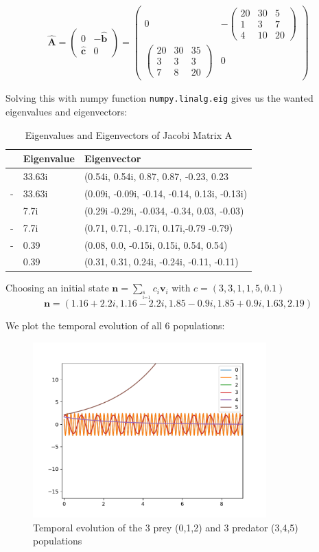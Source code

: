 \documentclass{article}
\begin{document}
\begin{align}
    \mathbf{\hat A} = 
    \left(
	\begin{matrix}
	    0 & - \mathbf{\hat b} \\
	    \mathbf{\hat c} & 0
	\end{matrix}
    \right) = %
    \left( \begin{matrix}
    0 &
    - \left(
	\begin{matrix}
	    20 & 30 & 5 \\ 
	    1 & 3 & 7 \\
	    4 & 10 & 20 
	\end{matrix}
    \right) \\
    \left(
	\begin{matrix}
	    20 & 30 & 35 \\ 
	    3 & 3 & 3 \\
	    7 & 8 & 20 
	\end{matrix}
    \right) & 0
    \end{matrix} \right)
\end{align}

Solving this with numpy function \texttt{numpy.linalg.eig} gives us the wanted
eigenvalues and eigenvectors:

\begin{table}[H]
    \centering
    \begin{tabular}{rll}
	\toprule 
& Eigenvalue & Eigenvector \\ \midrule
&33.63i & (0.54i, 0.54i, 0.87, 0.87, -0.23, 0.23 \\ 
-&33.63i & (0.09i, -0.09i, -0.14, -0.14, 0.13i, -0.13i) \\ 
&7.7i & (0.29i -0.29i, -0.034, -0.34, 0.03, -0.03)  \\ 
-&7.7i & (0.71, 0.71, -0.17i, 0.17i,-0.79 -0.79) \\ 
-&0.39 & (0.08, 0.0, -0.15i, 0.15i, 0.54, 0.54) \\ 
&0.39 & (0.31, 0.31, 0.24i, -0.24i, -0.11, -0.11)\\
\bottomrule 
\end{tabular}
\caption{Eigenvalues and Eigenvectors of Jacobi Matrix A}
\end{table}

Choosing an initial state \( \mathbf{n} = \sum_{^{6} _{\text{i=1}}}
    c_i \mathbf{v}_i \) with \( c = (3,3,1,1,5,0.1) \)
\[ 
    \mathbf{n} = (1.16+2.2i, 1.16-2.2i, 1.85-0.9i, 1.85+0.9i, 1.63, 2.19)
\]

We plot the temporal evolution of all 6 populations:
\begin{figure}[ht]
    \centering
    \includegraphics[width=9cm]{Populations.pdf} 
    \caption{Temporal evolution of the 3 prey (0,1,2) and 3 predator 
	(3,4,5) populations} 
\end{figure}
\end{document}
